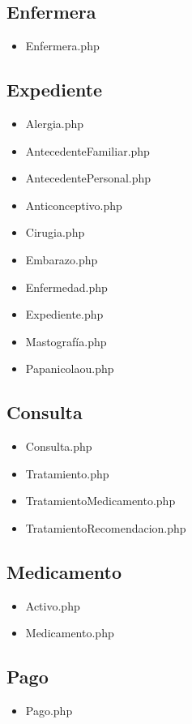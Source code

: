 		\subsection{Enfermera}
		\begin{itemize}
			\item Enfermera.php
		\end{itemize}				
		
		\subsection{Expediente}
		\begin{itemize}
			\item Alergia.php
			\item AntecedenteFamiliar.php
			\item AntecedentePersonal.php
			\item Anticonceptivo.php
			\item Cirugia.php
			\item Embarazo.php
			\item Enfermedad.php
			\item Expediente.php
			\item Mastografía.php
			\item Papanicolaou.php
		\end{itemize}				
		
		\subsection{Consulta}
		\begin{itemize}
			\item Consulta.php
			\item Tratamiento.php
			\item TratamientoMedicamento.php
			\item TratamientoRecomendacion.php
		\end{itemize}
		\subsection{Medicamento}
		\begin{itemize}
			\item Activo.php
			\item Medicamento.php
		\end{itemize}
		\subsection{Pago}
		\begin{itemize}
			\item Pago.php
		\end{itemize}
